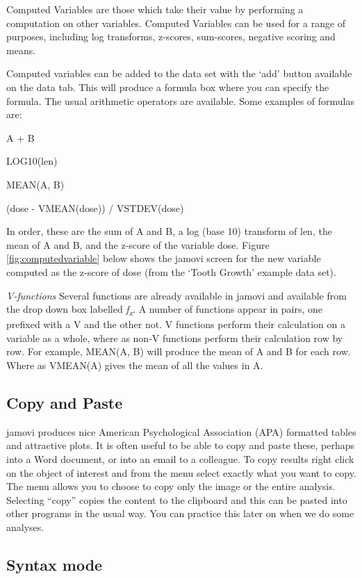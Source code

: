 \documentclass[
]{book}
\begin{document}
Computed Variables are those which take their value by performing a computation on other variables. Computed Variables can be used for a range of purposes, including log transforms, z-scores, sum-scores, negative scoring and means.

Computed variables can be added to the data set with the `add' button available on the data tab. This will produce a formula box where you can specify the formula. The usual arithmetic operators are available. Some examples of formulas are:

A + B

LOG10(len)

MEAN(A, B)

(dose - VMEAN(dose)) / VSTDEV(dose)

In order, these are the sum of A and B, a log (base 10) transform of len, the mean of A and B, and the z-score of the variable dose. Figure \ref{fig:computedvariable} below shows the jamovi screen for the new variable computed as the z-score of dose (from the `Tooth Growth' example data set).

\emph{V-functions}
Several functions are already available in jamovi and available from the drop down box labelled \emph{f\textsubscript{x}}. A number of functions appear in pairs, one prefixed with a V and the other not. V functions perform their calculation on a variable as a whole, where as non-V functions perform their calculation row by row. For example, MEAN(A, B) will produce the mean of A and B for each row. Where as VMEAN(A) gives the mean of all the values in A.

\hypertarget{copypaste}{%
\subsection{Copy and Paste}\label{copypaste}}

jamovi produces nice American Psychological Association (APA) formatted tables and attractive plots. It is often useful to be able to copy and paste these, perhaps into a Word document, or into an email to a colleague. To copy results right click on the object of interest and from the menu select exactly what you want to copy. The menu allows you to choose to copy only the image or the entire analysis. Selecting ``copy'' copies the content to the clipboard and this can be pasted into other programs in the usual way. You can practice this later on when we do some analyses.

\hypertarget{syntaxmode}{%
\subsection{Syntax mode}\label{syntaxmode}}
\end{document}
